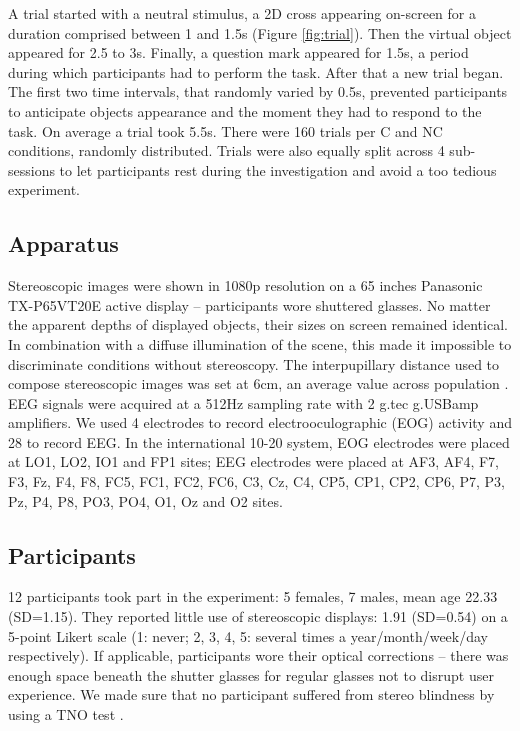 \documentclass{template/llncs}
\begin{document}
A trial started with a neutral stimulus, a 2D cross appearing on-screen for a duration comprised between 1 and 1.5s (Figure \ref{fig:trial}). Then the virtual object appeared for 2.5 to 3s. Finally, a question mark appeared for 1.5s, a period during which participants had to perform the task. After that a new trial began. The first two time intervals, that randomly varied by 0.5s, prevented participants to anticipate objects appearance and the moment they had to respond to the task. On average a trial took 5.5s. There were 160 trials per C and NC conditions, randomly distributed. Trials were also equally split across 4 sub-sessions to let participants rest during the investigation and avoid a too tedious experiment.

\subsection{Apparatus}\label{apparatus}

Stereoscopic images were shown in 1080p resolution on a 65 inches Panasonic TX-P65VT20E active display -- participants wore shuttered glasses. 
No matter the apparent depths of displayed objects, their sizes on screen remained identical. In combination with a diffuse illumination of the scene, this made it impossible to discriminate conditions without stereoscopy. The interpupillary distance used to compose stereoscopic images was set at 6cm, an average value across population \cite{Dodgson2004}. EEG signals were acquired at a 512Hz sampling rate with 2 g.tec g.USBamp amplifiers. 
We used 4 electrodes to record electrooculographic (EOG) activity and 28 to record EEG. In the international 10-20 system, EOG electrodes were placed at LO1, LO2, IO1 and FP1 sites; EEG electrodes were placed at AF3, AF4, F7, F3, Fz, F4, F8, FC5, FC1, FC2, FC6, C3, Cz, C4, CP5, CP1, CP2, CP6, P7, P3, Pz, P4, P8, PO3, PO4, O1, Oz and O2 sites. 


\subsection{Participants}\label{participants}

12 participants took part in the experiment: 5 females, 7 males, mean age 22.33 (SD=1.15). They reported little use of stereoscopic displays: 1.91 (SD=0.54) on a 5-point Likert scale (1: never; 2, 3, 4, 5: several times a year/month/week/day respectively). If applicable, participants wore their optical corrections -- there was enough space beneath the shutter glasses for regular glasses not to disrupt user experience. We made sure that no participant suffered from stereo blindness by using a TNO test \cite{Momeni-Moghadam2012}.
\end{document}
